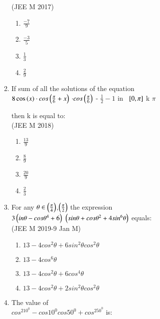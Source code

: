 \documentclass[journal,10pt,twocolumn]{IEEEtran}
\theoremstyle{remark}
\begin{document}
\begin{enumerate}
\hfill{(JEE M 2017)}\\
    \begin{enumerate}
    \item $\frac{-7}{9}$ 
    \item $\frac{-3}{5}$
    \item $\frac{1}{3}$
    \item $\frac{2}{9}$\\
    \end{enumerate}
 \item If sum of all the solutions of the equation\\
  $8 \cos\left(x\right) \cdot cos\left(\frac{\pi}{6} + x \right)$ $\cdot cos \left(\frac{\pi}{6}\right)$ - $\frac{1}{2} - 1 \text{ in }$ ${}\left[0, \pi\right]$ k $\pi$

 then k is equal to:\\
 
\hfill{(JEE M 2018)}\\
\begin{enumerate}
\item $\frac{13}{9}$
\item $\frac{8}{9}$\\
\item  $\frac{20}{9}$
\item  $\frac{2}{3}$\\
\end{enumerate}
  \item For any $\theta \in \left(\frac{\pi}{4}\right)$,$\left(\frac{\pi}{2}\right)$ the expression\\
 $3\left(in\theta-cos\theta^4 +6\right)$ $\left(sin\theta+cos\theta^2 +4sin^{6}\theta\right)$ equals:\\
 
\hfill {(JEE M 2019-9 Jan  M)}\\
 \begin{enumerate}
 \item $13-4cos^2\theta +6sin^2\theta cos^2\theta $\\
 \item  $13-4cos^6\theta$\\
\item  $13-4cos^2\theta +6cos^4\theta$\\
 \item $13-4cos^2\theta +2sin^2\theta cos^2\theta$\\
 \end{enumerate}
\item The value of\\ $cos^210^{0}-cos10^{0}cos50^{0}+cos^250^{0}$ is:\\


\end{enumerate}
\end{document}
